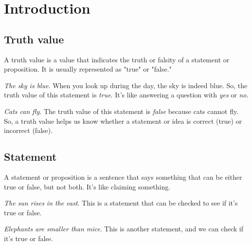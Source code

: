 \documentclass{article}
\theoremstyle{mytheoremstyle}
\theoremstyle{mytheoremstyle}
\theoremstyle{myexamplestyle}
\begin{document}
\tableofcontents

\newpage

\section{Introduction}

\subsection{Truth value}

\begin{definition}
    A truth value is a value that indicates the truth or falsity of a statement or proposition. It is usually represented as "true" or "false."
\end{definition}

\begin{example}
    \emph{The sky is blue}. When you look up during the day, the sky is indeed blue. So, the truth value of this statement is \emph{true}. It's like answering a question with \emph{yes} or \emph{no}.
\end{example}

\begin{example}
    \emph{Cats can fly}. The truth value of this statement is \emph{false} because cats cannot fly. So, a truth value helps us know whether a statement or idea is correct (true) or incorrect (false).
\end{example}


\subsection{Statement}

\begin{definition}
    A statement or proposition is a sentence that says something
    that can be either true or false, but not both. It's like
    claiming something.
\end{definition}

\begin{example}
    \emph{The sun rises in the east}. This is a statement that can be checked to see if it's true or false.
\end{example}

\begin{example}
    \emph{Elephants are smaller than mice}. This is another statement, and we can check if it's true or false.
\end{example}
\end{document}
